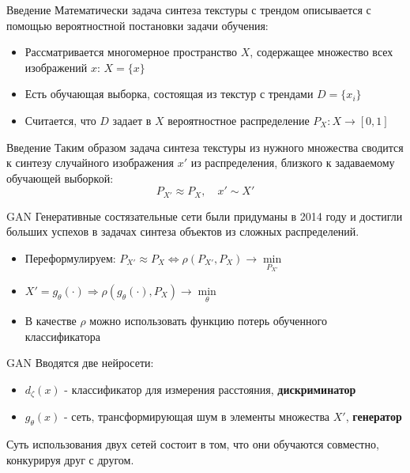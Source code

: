\documentclass[12pt]{beamer}
\begin{document}
	\begin{frame}{Введение}
		Математически задача синтеза текстуры с трендом описывается с помощью вероятностной постановки задачи обучения:
		\begin{itemize}
			\item Рассматривается многомерное пространство $X$, содержащее множество всех изображений $x$: $X = \{x\}$
			\item Есть обучающая выборка, состоящая из текстур с трендами $D = \{x_i\}$
			\item Считается, что  $D$ задает в $X$ вероятностное распределение $P_X : X \longrightarrow [0,1]$
		\end{itemize}
	\end{frame}
	
	\begin{frame}{Введение}
		Таким образом задача синтеза текстуры из нужного множества сводится к синтезу случайного изображения $x'$ из распределения, близкого к задаваемому обучающей выборкой:
		$$ P_{X'} \approx P_X, \quad x' \sim X'$$
	\end{frame}
	
	\begin{frame}{GAN}
		Генеративные состязательные сети были придуманы в 2014 году и достигли больших успехов в задачах синтеза объектов из сложных распределений.
		\begin{itemize}
			\item Переформулируем: $ P_{X'} \approx P_X \Leftrightarrow \rho(P_{X'}, P_X) \longrightarrow \underset{P_{X'}}{\min} $
			\item $ X' = g_{\theta}(\cdot) \Rightarrow \rho(g_{\theta}(\cdot), P_X) \longrightarrow \underset{\theta}{\min}$
			\item В качестве $\rho$ можно использовать функцию потерь обученного классификатора
		\end{itemize}
	\end{frame}
	
	\begin{frame}{GAN}
		Вводятся две нейросети:
		\begin{itemize}
			\item $d_{\zeta}(x)$ - классификатор для измерения расстояния, \textbf{дискриминатор}
			\item $g_{\theta}(x)$ - сеть, трансформирующая шум в элементы множества $X'$, \textbf{генератор}
		\end{itemize}
		Суть использования двух сетей состоит в том, что они обучаются совместно, конкурируя друг с другом.
	\end{frame}
	
\end{document}
